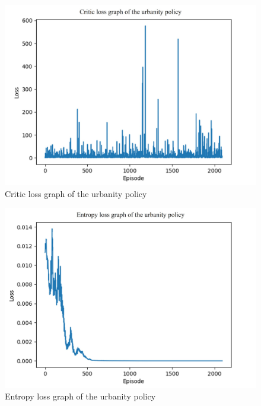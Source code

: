 \documentclass[preprint,12pt]{elsarticle}
\begin{document}
\begin{figure}[h!]
    \centering
    \includegraphics[width=0.7\linewidth]{paper/doc/result_figure/AFMORL_urb_cri_loss_v1.jpg}
    \caption{Critic loss graph of the urbanity policy}
    
    \label{fig:enter-label}
\end{figure}

\begin{figure}[h!]
    \centering
    \includegraphics[width=0.7\linewidth]{paper/doc/result_figure/AFMORL_urb_entr_loss_v1.jpg}
    \caption{Entropy loss graph of the urbanity policy}
    
    \label{fig:enter-label}
\end{figure}





\end{document}
